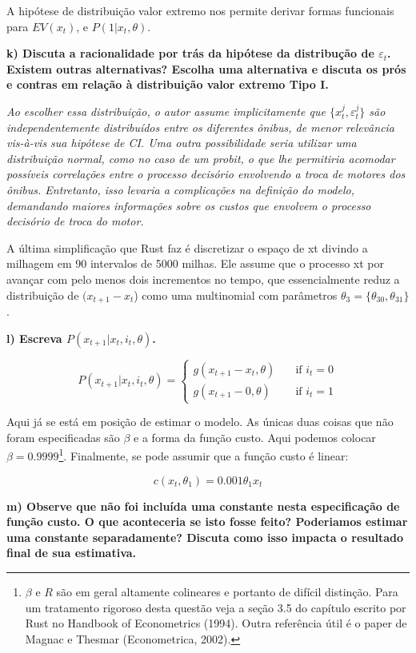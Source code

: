 \documentclass[12pt,a4paper]{article}
\let\rmarkdownfootnote\footnote%
\def\footnote{\protect\rmarkdownfootnote}
\begin{document}
A hipótese de distribuição valor extremo nos permite derivar formas
funcionais para \(EV(x_t)\), e \(P(1 | x_t, \theta)\).

\textbf{k) Discuta a racionalidade por trás da hipótese da distribução
de \(\varepsilon_t\). Existem outras alternativas? Escolha uma
alternativa e discuta os prós e contras em relação à distribuição valor
extremo Tipo I.}

\emph{Ao escolher essa distribuição, o autor assume implicitamente que
\(\{x_t^j,\varepsilon_t^j\}\) são independentemente distribuídos entre
os diferentes ônibus, de menor relevância vis-à-vis sua hipótese de CI.
Uma outra possibilidade seria utilizar uma distribuição normal, como no
caso de um probit, o que lhe permitiria acomodar possíveis correlações
entre o processo decisório envolvendo a troca de motores dos ônibus.
Entretanto, isso levaria a complicações na definição do modelo,
demandando maiores informações sobre os custos que envolvem o processo
decisório de troca do motor.}

A última simplificação que Rust faz é discretizar o espaço de xt divindo
a milhagem em 90 intervalos de 5000 milhas. Ele assume que o processo xt
por avançar com pelo menos dois incrementos no tempo, que essencialmente
reduz a distribuição de \((x_{t+1} - x_t\)) como uma multinomial com
parâmetros \(\theta_3 = \{\theta_{30}, \theta_{31}\}\).

\textbf{l) Escreva \(P (x_{t+1}| x_t, i_t, \theta)\).}

\[
P (x_{t+1}| x_t, i_t, \theta) =
\begin{cases}
  g(x_{t+1} - x_t,\theta) & \quad \text{if } i_t=0 \\
  g(x_{t+1} - 0,\theta) & \quad \text{if } i_t=1
\end{cases}
\]

Aqui já se está em posição de estimar o modelo. As únicas duas coisas
que não foram especificadas são \(\beta\) e a forma da função custo.
Aqui podemos colocar \(\beta = 0.9999\)\footnote{\(\beta\) e \(R\) são
  em geral altamente colineares e portanto de difícil distinção. Para um
  tratamento rigoroso desta questão veja a seção 3.5 do capítulo escrito
  por Rust no Handbook of Econometrics (1994). Outra referência útil é o
  paper de Magnac e Thesmar (Econometrica, 2002).}. Finalmente, se pode
assumir que a função custo é linear:

\[
c (x_t, \theta_1) = 0.001 \theta_1 x_t
\]

\textbf{m) Observe que não foi incluída uma constante nesta
especificação de função custo. O que aconteceria se isto fosse feito?
Poderiamos estimar uma constante separadamente? Discuta como isso
impacta o resultado final de sua estimativa.}
\end{document}
